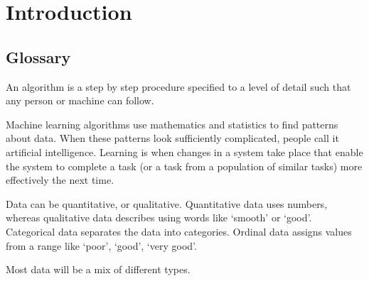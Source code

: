 \chapter{Introduction}

\section{Glossary}
An algorithm is a step by step procedure specified to a level of detail such that any person or machine can follow.

Machine learning algorithms use mathematics and statistics to find patterns about data. When these patterns look sufficiently complicated, people call it artificial intelligence. Learning is when changes in a system take place that enable the system to complete a task (or a task from a population of similar tasks) more effectively the next time.

Data can be quantitative, or qualitative. Quantitative data uses numbers, whereas qualitative data describes using words like `smooth' or `good'. Categorical data separates the data into categories. Ordinal data assigns values from a range like `poor', `good', `very good'.

Most data will be a mix of different types.
